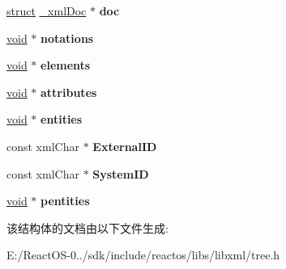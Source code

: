 \begin{DoxyCompactItemize}
\item 
\mbox{\label{struct__xml_dtd_a18f3c011bb87c79ae95bbecef3dd0b8a}} 
\hyperlink{interfacestruct}{struct} \hyperlink{struct__xml_doc}{\+\_\+xml\+Doc} $\ast$ {\bfseries doc}
\item 
\mbox{\label{struct__xml_dtd_ad534175a81261c5f1ad7ea6392072c21}} 
\hyperlink{interfacevoid}{void} $\ast$ {\bfseries notations}
\item 
\mbox{\label{struct__xml_dtd_a9a9f0ad6fe0df90737be11e9afedbcdd}} 
\hyperlink{interfacevoid}{void} $\ast$ {\bfseries elements}
\item 
\mbox{\label{struct__xml_dtd_af7ff0b9a49fa0bca079e52c48d8cfb4f}} 
\hyperlink{interfacevoid}{void} $\ast$ {\bfseries attributes}
\item 
\mbox{\label{struct__xml_dtd_ad015489c07cded87195e5eeb0f6cb0b7}} 
\hyperlink{interfacevoid}{void} $\ast$ {\bfseries entities}
\item 
\mbox{\label{struct__xml_dtd_ae44f8a5ca40e8df30f4901182278b00d}} 
const xml\+Char $\ast$ {\bfseries External\+ID}
\item 
\mbox{\label{struct__xml_dtd_adf2a9eb2fe7b1129c45a78432a86e390}} 
const xml\+Char $\ast$ {\bfseries System\+ID}
\item 
\mbox{\label{struct__xml_dtd_a24703d9ba5942d4cb0cf8b2c19f63243}} 
\hyperlink{interfacevoid}{void} $\ast$ {\bfseries pentities}
\end{DoxyCompactItemize}


该结构体的文档由以下文件生成\+:\begin{DoxyCompactItemize}
\item 
E\+:/\+React\+O\+S-\/0../sdk/include/reactos/libs/libxml/tree.\+h\end{DoxyCompactItemize}
